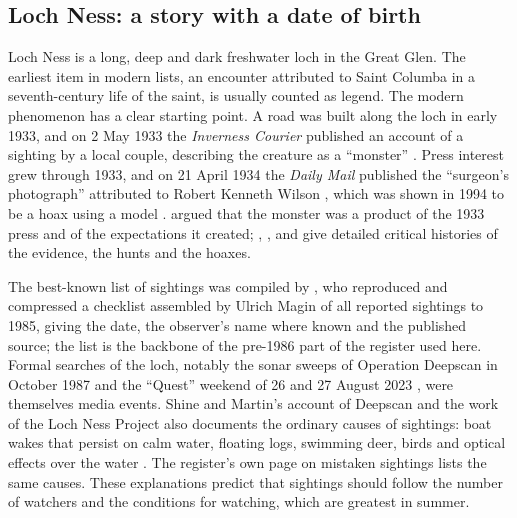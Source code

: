 \documentclass[11pt,a4paper]{article}
\begin{document}
\subsection{Loch Ness: a story with a date of birth}
Loch Ness is a long, deep and dark freshwater loch in the Great Glen. The earliest item in modern lists, an encounter attributed to Saint Columba in a seventh-century life of the saint, is usually counted as legend. The modern phenomenon has a clear starting point. A road was built along the loch in early 1933, and on 2 May 1933 the \emph{Inverness Courier} published an account of a sighting by a local couple, describing the creature as a ``monster'' \citep{wiki2026nessie,courier2023}. Press interest grew through 1933, and on 21 April 1934 the \emph{Daily Mail} published the ``surgeon's photograph'' attributed to Robert Kenneth Wilson \citep{wiki2026wilson}, which was shown in 1994 to be a hoax using a model \citep{martin1999,boese2002}. \citet{binns1983} argued that the monster was a product of the 1933 press and of the expectations it created; \citet{campbell1991}, \citet{williams2015}, \citet{loxton2013} and \citet{naish2016} give detailed critical histories of the evidence, the hunts and the hoaxes.

The best-known list of sightings was compiled by \citet{bauer1986}, who reproduced and compressed a checklist assembled by Ulrich Magin of all reported sightings to 1985, giving the date, the observer's name where known and the published source; the list is the backbone of the pre-1986 part of the register used here. Formal searches of the loch, notably the sonar sweeps of Operation Deepscan in October 1987 \citep{shine1988} and the ``Quest'' weekend of 26 and 27 August 2023 \citep{lochness2023}, were themselves media events. Shine and Martin's account of Deepscan and the work of the Loch Ness Project also documents the ordinary causes of sightings: boat wakes that persist on calm water, floating logs, swimming deer, birds and optical effects over the water \citep{shine1988}. The register's own page on mistaken sightings lists the same causes. These explanations predict that sightings should follow the number of watchers and the conditions for watching, which are greatest in summer.
\end{document}
